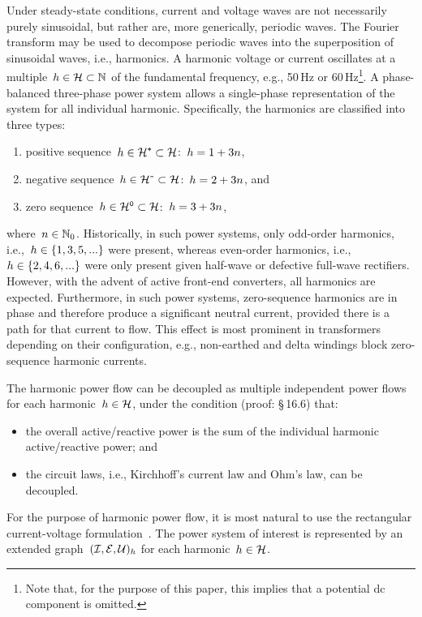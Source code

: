 Under steady-state conditions, current and voltage waves are not necessarily purely sinusoidal, but rather are, more generically, periodic waves. The Fourier transform may be used to decompose periodic waves into the superposition of sinusoidal waves, i.e., harmonics. A harmonic voltage or current oscillates at a multiple~$h \in \mathcal{H} \subset \mathbb{N}$ of the fundamental frequency, e.g., 50\,Hz or 60\,Hz\footnote{Note that, for the purpose of this paper, this implies that a potential dc component is omitted.}. A phase-balanced three-phase power system allows a single-phase representation of the system for all individual harmonic. Specifically, the harmonics are classified into three types:
\begin{enumerate}
    \item positive sequence~$h \in \mathcal{H}^{\texttt{+}} \subset \mathcal{H}$:~$h=1+3n$,
    \item negative sequence~$h \in \mathcal{H}^{\texttt{-}} \subset \mathcal{H}$:~$h=2+3n$, and
    \item zero sequence~$h \in \mathcal{H}^{\texttt{0}} \subset \mathcal{H}$:~$h=3+3n$,
\end{enumerate}
where~$n \in \mathbb{N}_{0}$. Historically, in such power systems, only odd-order harmonics, i.e.,~$h \in \{1,3,5,...\}$ were present, whereas even-order harmonics, i.e.,~$h \in \{2,4,6,...\}$ were only present given half-wave or defective full-wave rectifiers. However, with the advent of active front-end converters, all harmonics are expected. Furthermore, in such power systems, zero-sequence harmonics are in phase and therefore produce a significant neutral current, provided there is a path for that current to flow. This effect is most prominent in transformers depending on their configuration, e.g., non-earthed and delta windings block zero-sequence harmonic currents.

The harmonic power flow can be decoupled as multiple independent power flows for each harmonic~$h \in \mathcal{H}$, under the condition (proof: \cite{nilsson_electric_2015} \S\,16.6) that:~
\begin{itemize}
    \item the overall active/reactive power is the sum of the individual harmonic active/reactive power; and
    \item the circuit laws, i.e., Kirchhoff's current law and Ohm's law, can be decoupled.
\end{itemize}
For the purpose of harmonic power flow, it is most natural to use the rectangular current-voltage formulation~\cite{geth_pitfalls_2023}. The power system of interest is represented by an extended graph~$(\mathcal{I},\mathcal{E},\mathcal{U})_{h}$ for each harmonic~$h \in \mathcal{H}$. 

